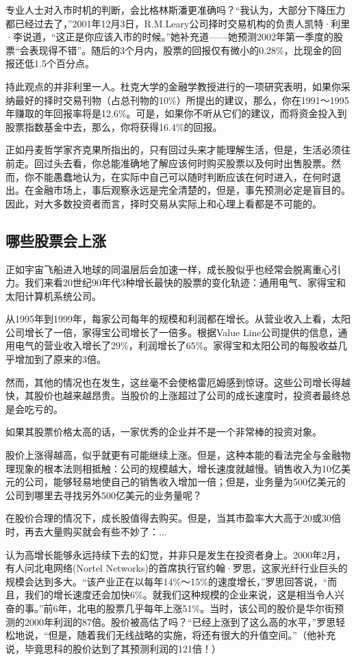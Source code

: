 \documentclass[12pt,oneside]{book}
\begin{document}
专业人士对入市时机的判断，会比格林斯潘更准确吗？“我认为，大部分下降压力都已经过去了，”2001年12月3日，R.M.Leary公司择时交易机构的负责人凯特·利里·李说道，“这正是你应该入市的时候。”她补充道——她预测2002年第一季度的股票“会表现得不错”。随后的3个月内，股票的回报仅有微小的0.28\%，比现金的回报还低1.5个百分点。

持此观点的并非利里一人。杜克大学的金融学教授进行的一项研究表明，如果你采纳最好的择时交易刊物（占总刊物的10\%）所提出的建议，那么，你在1991～1995年赚取的年回报率将是12.6\%。可是，如果你不听从它们的建议，而将资金投入到股票指数基金中去，那么，你将获得16.4\%的回报。

正如丹麦哲学家齐克果所指出的，只有回过头来才能理解生活，但是，生活必须往前走。回过头去看，你总能准确地了解应该何时购买股票以及何时出售股票。然而，你不能愚蠢地认为，在实际中自己可以随时判断应该在何时进入，在何时退出。在金融市场上，事后观察永远是完全清楚的，但是，事先预测必定是盲目的。因此，对大多数投资者而言，择时交易从实际上和心理上看都是不可能的。

\subsection{哪些股票会上涨}
正如宇宙飞船进入地球的同温层后会加速一样，成长股似乎也经常会脱离重心引力。我们来看20世纪90年代3种增长最快的股票的变化轨迹：通用电气、家得宝和太阳计算机系统公司。

从1995年到1999年，每家公司每年的规模和利润都在增长。从营业收入上看，太阳公司增长了一倍，家得宝公司增长了一倍多。根据Value Line公司提供的信息，通用电气的营业收入增长了29\%，利润增长了65\%。家得宝和太阳公司的每股收益几乎增加到了原来的3倍。

然而，其他的情况也在发生，这丝毫不会使格雷厄姆感到惊讶。这些公司增长得越快，其股价也越来越昂贵。当股价的上涨超过了公司的成长速度时，投资者最终总是会吃亏的。

如果其股票价格太高的话，一家优秀的企业并不是一个非常棒的投资对象。

股价上涨得越高，似乎就更有可能继续上涨。但是，这种本能的看法完全与金融物理现象的根本法则相抵触：公司的规模越大，增长速度就越慢。销售收入为10亿美元的公司，能够轻易地使自己的销售收入增加一倍；但是，业务量为500亿美元的公司到哪里去寻找另外500亿美元的业务量呢？

在股价合理的情况下，成长股值得去购买。但是，当其市盈率大大高于20或30倍时，再去大量购买就会有些不妙了：...

认为高增长能够永远持续下去的幻觉，并非只是发生在投资者身上。2000年2月，有人问北电网络(Nortel Networks)的首席执行官约翰·罗思，这家光纤行业巨头的规模会达到多大。“该产业正在以每年14\%～15\%的速度增长，”罗思回答说，“而且，我们的增长速度还会加快6\%。就我们这种规模的企业来说，这是相当令人兴奋的事。”前6年，北电的股票几乎每年上涨51\%。当时，该公司的股价是华尔街预测的2000年利润的87倍。股价被高估了吗？“已经上涨到了这么高的水平，”罗思轻松地说，“但是，随着我们无线战略的实施，将还有很大的升值空间。”（他补充说，毕竟思科的股价达到了其预测利润的121倍！）
\end{document}
